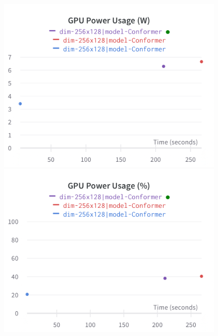 \documentclass{article}
\begin{document}
\begin{figure}[!htb]
\includegraphics[width=\linewidth]{charts/Section-4-Panel-0-8oehr5jkv}
\caption{}
\endminipage\hfill
{}
\includegraphics[width=\linewidth]{charts/Section-4-Panel-1-emedsv941}
\caption{}
\endminipage
\end{figure}
\end{document}
